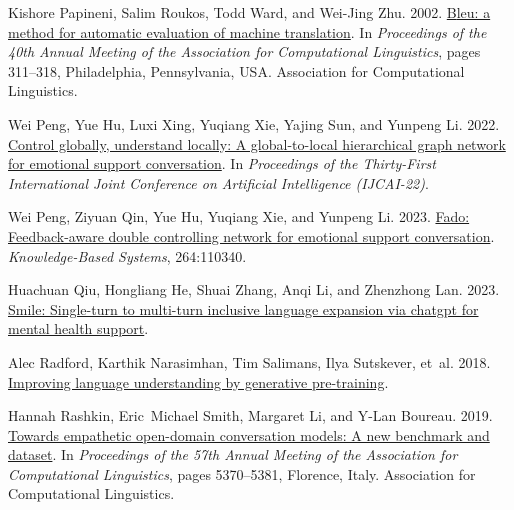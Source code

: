 \documentclass[11pt]{article}
\begin{document}
\begin{thebibliography}{20}
Kishore Papineni, Salim Roukos, Todd Ward, and Wei-Jing Zhu. 2002.
\newblock \href {https://doi.org/10.3115/1073083.1073135} {{B}leu: a method for automatic evaluation of machine translation}.
\newblock In \emph{Proceedings of the 40th Annual Meeting of the Association for Computational Linguistics}, pages 311--318, Philadelphia, Pennsylvania, USA. Association for Computational Linguistics.

Wei Peng, Yue Hu, Luxi Xing, Yuqiang Xie, Yajing Sun, and Yunpeng Li. 2022.
\newblock \href {https://www.ijcai.org/proceedings/2022/0600.pdf} {Control globally, understand locally: A global-to-local hierarchical graph network for emotional support conversation}.
\newblock In \emph{Proceedings of the Thirty-First International Joint Conference on Artificial Intelligence (IJCAI-22)}.

Wei Peng, Ziyuan Qin, Yue Hu, Yuqiang Xie, and Yunpeng Li. 2023.
\newblock \href {https://doi.org/https://doi.org/10.1016/j.knosys.2023.110340} {Fado: Feedback-aware double controlling network for emotional support conversation}.
\newblock \emph{Knowledge-Based Systems}, 264:110340.

Huachuan Qiu, Hongliang He, Shuai Zhang, Anqi Li, and Zhenzhong Lan. 2023.
\newblock \href {http://arxiv.org/abs/2305.00450} {Smile: Single-turn to multi-turn inclusive language expansion via chatgpt for mental health support}.

Alec Radford, Karthik Narasimhan, Tim Salimans, Ilya Sutskever, et~al. 2018.
\newblock \href {http://cdn.openai.com/research-covers/language-unsupervised/language_understanding_paper.pdf} {Improving language understanding by generative pre-training}.

Hannah Rashkin, Eric~Michael Smith, Margaret Li, and Y-Lan Boureau. 2019.
\newblock \href {https://doi.org/10.18653/v1/P19-1534} {Towards empathetic open-domain conversation models: A new benchmark and dataset}.
\newblock In \emph{Proceedings of the 57th Annual Meeting of the Association for Computational Linguistics}, pages 5370--5381, Florence, Italy. Association for Computational Linguistics.


\end{thebibliography}
\end{document}
